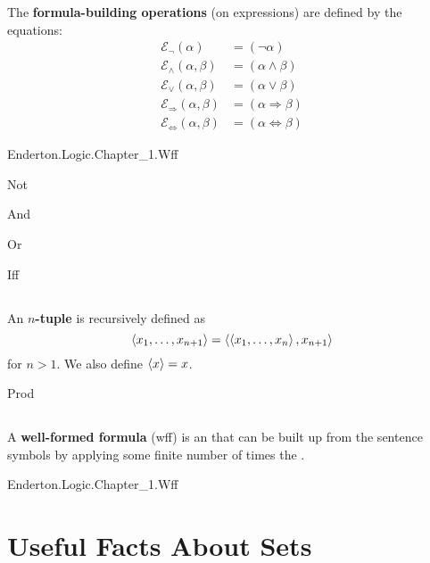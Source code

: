 \documentclass{report}
\begin{document}
  The \textbf{formula-building operations} (on expressions) are defined by the
  equations:
    \begin{align*}
      \mathcal{E}_{\neg}(\alpha)
        & = (\neg \alpha) \\
      \mathcal{E}_{\land}(\alpha, \beta)
        & = (\alpha \land \beta) \\
      \mathcal{E}_{\lor}(\alpha, \beta)
        & = (\alpha \lor \beta) \\
      \mathcal{E}_{\Rightarrow}(\alpha, \beta)
        & = (\alpha \Rightarrow \beta) \\
      \mathcal{E}_{\Leftrightarrow}(\alpha, \beta)
        & = (\alpha \Leftrightarrow \beta)
    \end{align*}

    {Enderton.Logic.Chapter\_1.Wff}

    {Not}

    {And}

    {Or}

    {Iff}

\section{}%

  An \textbf{$n$-tuple} is recursively defined as
    $$\left< x_1, \ldots, x_{n+1} \right> = \left< \left< x_1, \ldots, x_n \right>, x_{n+1} \right>$$
    for $n > 1$.
  We also define $\left< x \right> = x$.

    {Prod}

\section{}%

  A \textbf{well-formed formula} (wff) is an  that can
    be built up from the sentence symbols by applying some finite number of
    times the .

    {Enderton.Logic.Chapter\_1.Wff}

\endgroup

\setcounter{chapter}{0}
\addtocounter{chapter}{-1}
\chapter{Useful Facts About Sets}%
\end{document}
